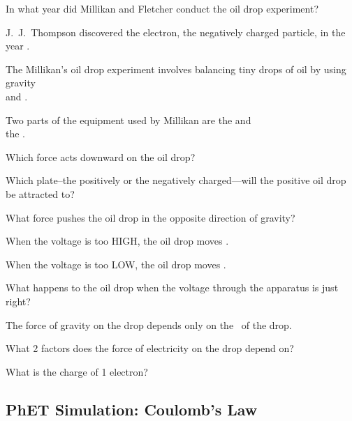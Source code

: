 \documentclass[answers]{exam}
\begin{document}
\begin{questions}

\begin{doublespace}
    

\question \label{6YGfUm}
In what year did Millikan and Fletcher conduct the oil drop experiment? \fillin[][3cm]


\question
J.~J.~Thompson discovered the electron, the negatively charged particle, in the year \fillin[][3cm].


\question
The Millikan's oil drop experiment involves balancing tiny drops of oil by using gravity\\and \fillin[][2.5cm].



\question
Two parts of the equipment used by Millikan are the \fillin[][3cm] and\\the \fillin[][3cm].


\question
Which force acts downward on the oil drop? \fillin[][3cm]


\question
Which plate--the positively or the negatively charged---will the positive oil drop be attracted to? 

\fillwithlines{7mm}


\question
What force pushes the oil drop in the opposite direction of gravity? \fillin[][3cm]


\question
When the voltage is too HIGH, the oil drop moves \fillin[][4cm].


\question
When the voltage is too LOW, the oil drop moves \fillin[][4cm].


\question
What happens to the oil drop when the voltage through the apparatus is just right?

\fillwithlines{7mm}


\question
The force of gravity on the drop depends only on the \fillin[][3cm]\ of the drop.


\question
What 2 factors does the force of electricity on the drop depend on?

\fillwithlines{7mm}


\question \label{Q68N4Y}
What is the charge of 1 electron? \fillin[][6cm]

\end{doublespace}

\end{questions}

\clearpage

\subsection*{PhET Simulation: Coulomb's Law}
\end{document}
